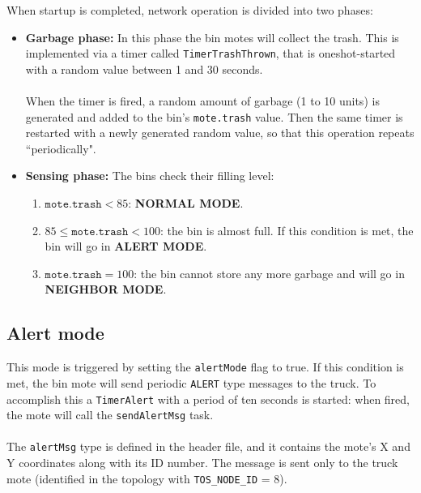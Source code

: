 \documentclass[a4paper,10pt]{article}
\begin{document}
\noindent When startup is completed, network operation is divided into two phases:
\begin{itemize}
	\item \textbf{Garbage phase:} In this phase the bin motes will collect the trash. This is implemented via a timer called \texttt{TimerTrashThrown}, that is oneshot-started with a random value between 1 and 30 seconds.\\\\ When the timer is fired, a random amount of garbage (1 to 10 units) is generated and added to the bin's \texttt{mote.trash} value. Then the same timer is restarted with a newly generated random value, so that this operation repeats ``periodically".
	\item \textbf{Sensing phase:} The bins check their filling level:
	\begin{enumerate}
		\item $\texttt{mote.trash} < 85$: \textbf{NORMAL MODE}.  
		\item $85 \leq \texttt{mote.trash} < 100$: the bin is almost full. If this condition is met, the bin will go in \textbf{ALERT MODE}.
		\item $\texttt{mote.trash} = 100$: the bin cannot store any more garbage and will go in \textbf{NEIGHBOR MODE}.
	\end{enumerate}
\end{itemize}
\subsection{Alert mode}
This mode is triggered by setting the \texttt{alertMode} flag to true. If this condition is met, the bin mote will send periodic \texttt{ALERT} type messages to the truck. To accomplish this a \texttt{TimerAlert} with a period of ten seconds is started: when fired, the mote will call the \texttt{sendAlertMsg} task. \\\\
The \texttt{alertMsg} type is defined in the header file, and it contains the mote's X and Y coordinates along with its ID number. The message is sent only to the truck mote (identified in the topology with \texttt{TOS\_NODE\_ID} = 8).
\end{document}
